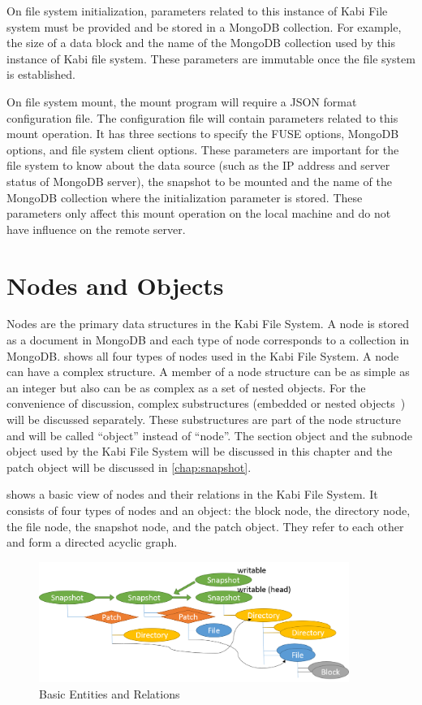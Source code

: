    On file system initialization, parameters related to this instance of Kabi File system must be provided and be stored in a MongoDB collection. For example, the size of a data block and the name of the MongoDB collection used by this instance of Kabi file system. These parameters are immutable once the file system is established.

    On file system mount, the mount program will require a JSON format configuration file. The configuration file will contain parameters related to this mount operation. It has three sections to specify the FUSE options, MongoDB options, and file system client options. These parameters are important for the file system to know about the data source (such as the IP address and server status of MongoDB server), the snapshot to be mounted and the name of the MongoDB collection where the initialization parameter is stored. These parameters only affect this mount operation on the local machine and do not have influence on the remote server.

\section{Nodes and Objects}

    Nodes are the primary data structures in the Kabi File System. A node is stored as a document in MongoDB and each type of node corresponds to a collection in MongoDB.  shows all four types of nodes used in the Kabi File System. A node can have a complex structure. A member of a node structure can be as simple as an integer but also can be as complex as a set of nested objects. For the convenience of discussion, complex substructures (embedded or nested objects~\cite{bson}) will be discussed separately. These substructures are part of the node structure and will be called ``object'' instead of ``node''. The section object and the subnode object used by the Kabi File System will be discussed in this chapter and the patch object will be discussed in \cref{chap:snapshot}.

     shows a basic view of nodes and their relations in the Kabi File System. It consists of four types of nodes and an object: the block node, the directory node, the file node, the snapshot node, and the patch object. They refer to each other and form a directed acyclic graph. 

\begin{figure}[t]
\centering
\includegraphics[width=0.9\textwidth]{Chapter-3/figs/fig2.png}
\caption{Basic Entities and Relations}
\label{fig:basic_entities}
\end{figure}

